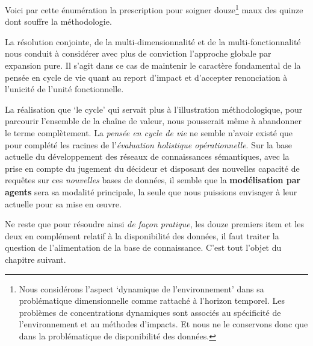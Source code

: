 Voici par cette énumération la prescription pour soigner douze\footnote{
Nous considérons l'aspect `dynamique de l'environnement' dans sa problématique dimensionnelle comme rattaché à l'horizon temporel.
Les problèmes de concentrations dynamiques sont associés au spécificité de l'environnement et au méthodes d'impacts.
Et nous ne le conservons donc que dans la problématique de disponibilité des données.
} maux des quinze dont souffre la méthodologie.

La résolution conjointe, de la multi-dimensionnalité et de la multi-fonctionnalité nous conduit à considérer avec plus de conviction l'approche globale par expansion pure.
Il s'agit dans ce cas de maintenir le caractère fondamental de la pensée en cycle de vie quant au report d'impact et d'accepter renonciation à l'unicité de l'unité fonctionnelle.

La réalisation que `le cycle' qui servait plus à l'illustration méthodologique, pour parcourir l'ensemble de la chaîne de valeur, nous pousserait même à abandonner le terme complètement.
La \emph{pensée en cycle de vie} ne semble n'avoir existé que pour complété les racines de l'\emph{évaluation holistique opérationnelle}.
Sur la base actuelle du développement des réseaux de connaissances sémantiques, avec la prise en compte du jugement du décideur et disposant des nouvelles capacité de requêtes sur ces \textit{nouvelles} bases de données, il semble que la \textbf{modélisation par agents} sera sa modalité principale, la seule que nous puissions envisager à leur actuelle pour sa mise en œuvre.

Ne reste que pour résoudre ainsi \emph{de façon pratique}, les douze premiers item et les deux en complément relatif à la disponibilité des données, il faut traiter la question de l'alimentation de la base de connaissance.
C'est tout l'objet du chapitre suivant.